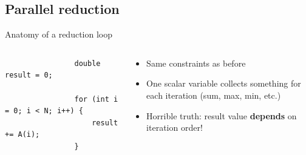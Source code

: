 \documentclass[aspectratio=169]{beamer}
\newcommand{\highlight}[1]{\textcolor{main}{\textbf{#1}}}
\begin{document}

\subsection[Parallel reduction]{Parallel reduction}


\begin{frame}[fragile]{Anatomy of a reduction loop}
    \begin{columns}
        \begin{column}{0.5\linewidth}
            \begin{verbatim}
                double result = 0;

                for (int i = 0; i < N; i++) {
                    result += A(i);
                }
            \end{verbatim}
        \end{column}
        \begin{column}{0.5\linewidth}
            \begin{itemize}
                \item Same constraints as before
                \item One scalar variable collects something for each iteration (sum, max, min, etc.)
                \item Horrible truth: result value \highlight{depends} on iteration order!
            \end{itemize}
        \end{column}
    \end{columns}
\end{frame}

\end{document}
